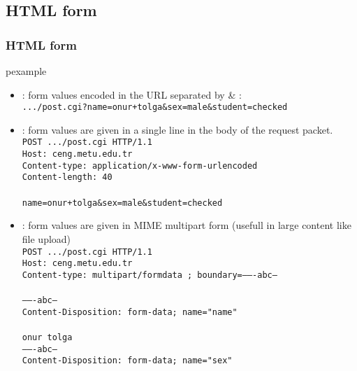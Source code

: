 \documentclass[trans,compress,xcolor=table]{beamer}
\begin{document}
\begin{frame}
\subsection{HTML form}
\frametitle{HTML form}
\begin{beamercolorbox}{pexample}
\codehtmlform
\end{beamercolorbox}
\end{frame}

\begin{frame}
\begin{itemize}
\item  {}: form values encoded in the URL separated by \& :\\
	\texttt{.../post.cgi?name=onur+tolga\&sex=male\&student=checked}
\item {}: form values are given in a single line in the body of the request packet.\\ {\scriptsize
	\texttt{POST .../post.cgi HTTP/1.1}\\
	\texttt{Host: ceng.metu.edu.tr}\\
	\texttt{Content-type: application/x-www-form-urlencoded}\\
	\texttt{Content-length: 40}\\
	\texttt{}\\
	\texttt{name=onur+tolga\&sex=male\&student=checked}\\
	}
\item {}: form values are given in MIME multipart form (usefull in large content like file upload)\\ {\tiny
	\texttt{POST .../post.cgi HTTP/1.1}\\
	\texttt{Host: ceng.metu.edu.tr}\\
	\texttt{Content-type: multipart/formdata ;  boundary=-------abc--}\\
	\texttt{}\\
	\texttt{-------abc--}\\
	\texttt{Content-Disposition: form-data; name="name"}\\
	\texttt{}\\
	\texttt{onur tolga}\\
	\texttt{-------abc--}\\
	\texttt{Content-Disposition: form-data; name="sex"}\\
	}
\end{itemize}
\end{frame}
\end{document}
